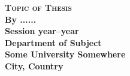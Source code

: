 \documentclass[11pt]{article}
\begin{document}
\begin{titlepage}
	\centering
	{\Huge\bfseries\scshape Topic of Thesis}\\
	{\bfseries\Large By ......}\\
	{\bfseries Session year--year}\\
	{\bfseries\Large Department of Subject}\\
	{\bfseries\Large\gothfamily Some University Somewhere}\\
	{\bfseries\Large City, Country}
\end{titlepage}
\end{document}
